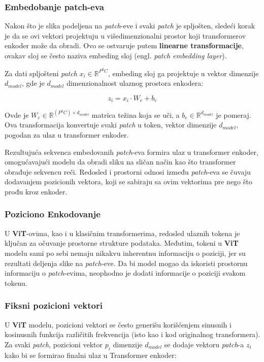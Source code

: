 \documentclass[12pt]{article}
\begin{document}
   \subsubsection*{Embedobanje patch-eva}

   Nakon što je slika podeljena na \textit{patch}-eve i svaki \textit{patch} je spljošten, 
   sledeći korak je da se ovi vektori projektuju u višedimenzionalni prostor koji transformerov 
   enkoder može da obradi. Ovo se ostvaruje putem \textbf{linearne transformacije}, ovakav sloj 
   se često naziva embeding sloj (engl. \textit{patch embedding layer}).

   Za dati spljošteni \textit{patch} \( x_i \in \mathbb{R}^{P^2C} \), embeding sloj 
   ga projektuje u vektor dimenzije \( d_{model} \), gde je \( d_{model} \) dimenzionalnost 
   ulaznog prostora enkodera:

   \[
   z_i = x_i \cdot W_e + b_e
   \]

   Ovde je \( W_e \in \mathbb{R}^{(P^2C) \times d_{model}} \) matrica težina koja se uči, 
   a \( b_e \in \mathbb{R}^{d_{model}} \) je pomeraj. Ova transformacija konvertuje svaki 
   \textit{patch} u token, vektor dimenzije \( d_{model} \), pogodan za ulaz u transformer enkoder.

   Rezultujuća sekvenca embedovanih \textit{patch}-eva formira ulaz u transformer enkoder, 
   omogućavajući modelu da obradi sliku na sličan način kao što transformer obrađuje sekvencu reči. 
   Redosled i prostorni odnosi između \textit{patch}-eva se čuvaju dodavanjem pozicionih vektora, 
   koji se sabiraju sa ovim vektorima pre nego što prođu kroz enkoder.

   \subsubsection{Poziciono Enkodovanje}
   U \textbf{ViT}-ovima, kao i u klasičnim transformerima, redosled ulaznih tokena je ključan 
   za očuvanje prostorne strukture podataka. Međutim, tokeni u \textbf{ViT} modelu sami po sebi 
   nemaju nikakvu inherentnu informaciju o poziciji, jer su rezultati deljenja slike na 
   \textit{patch}-eve. Da bi model mogao da iskoristi prostornu informaciju o \textit{patch}-evima, 
   neophodno je dodati informacije o poziciji svakom tokenu.


   \subsubsection*{Fiksni pozicioni vektori}
   U \textbf{ViT} modelu, pozicioni vektori se često generišu korišćenjem sinusnih i kosinusnih 
   funkcija različitih frekvencija (isto kao i kod originalnog transformera). Za svaki 
   \textit{patch}, pozicioni vektor \( p_i \) dimenzije \( d_{model} \) se dodaje 
   vektoru \textit{patch}-a \( z_i \) kako bi se formirao finalni ulaz u Transformer enkoder:
\end{document}
